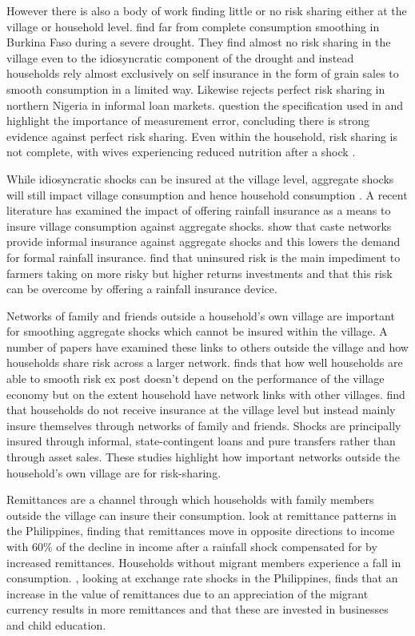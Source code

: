 However there is also a body of work finding little or no risk sharing either at the village or household level. \cite{kaziangaudry2006} find far from complete consumption smoothing in Burkina Faso during a severe drought. They find almost no risk sharing in the village even to the idiosyncratic component of the drought and instead households rely almost exclusively on self insurance in the form of grain sales to smooth consumption in a limited way. Likewise \cite{udry1994} rejects perfect risk sharing in northern Nigeria in informal loan markets. \cite{ravallion1997risk} question the specification used in \cite{Townsend1994} and highlight the importance of measurement error, concluding there is strong evidence against perfect risk sharing. Even within the household, risk sharing is not complete, with wives experiencing reduced nutrition after a shock \citep{derconkrishnan2000}.

While idiosyncratic shocks can be insured at the village level, aggregate shocks will still impact village consumption and hence household consumption \citep{mace1991full}. A recent literature has examined the impact of offering rainfall insurance as a means to insure village consumption against aggregate shocks. \cite{mobarakrosenzweig2012} show that caste networks provide informal insurance against aggregate shocks and this lowers the demand for formal rainfall insurance. \cite{karlanudry2012} find that uninsured risk is the main impediment to farmers taking on more risky but higher returns investments and that this risk can be overcome by offering a rainfall insurance device.  

Networks of family and friends outside a household's own village are important for smoothing aggregate shocks which cannot be insured within the village. A number of papers have examined these links to others outside the village and how households share risk across a larger network. \cite{rosenzweig1988} finds that how well households are able to smooth risk ex post doesn't depend on the performance of the village economy but on the extent household have network links with other villages. \cite{fafchampslund2003} find that households do not receive insurance at the village level but instead mainly insure themselves through networks of family and friends. Shocks are principally insured through informal, state-contingent loans and pure transfers rather than through asset sales. These studies highlight how important networks outside the household's own village are for risk-sharing. 

Remittances are a channel through which households with family members outside the village can insure their consumption. \cite{yangchoi2007} look at remittance patterns in the Philippines, finding that remittances move in opposite directions to income with 60\% of the decline in income after a rainfall shock compensated for by increased remittances. Households without migrant members experience a fall in consumption.  \cite{yang2008}, looking at exchange rate shocks in the Philippines, finds that an increase in the value of remittances due to an appreciation of the migrant currency results in more remittances and that these are invested in businesses and child education.  

